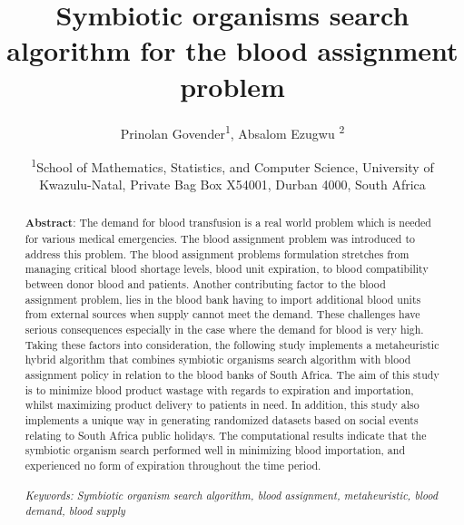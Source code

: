\documentclass{article}
\title{Symbiotic organisms search algorithm for the blood assignment problem}
\author{Prinolan Govender\textsuperscript{1}, Absalom Ezugwu \textsuperscript{2}}
\date{\textsuperscript{1}School of Mathematics, Statistics, and Computer Science, University of Kwazulu-Natal, Private Bag Box X54001, Durban 4000, South Africa}
\begin{document}
\maketitle
\begin{abstract}
  \textbf{Abstract}: The demand for blood transfusion is a real world problem which is needed for various medical emergencies. The blood assignment problem was introduced to address this problem. The blood assignment problems formulation stretches from managing critical blood shortage levels, blood unit expiration, to blood compatibility between donor blood and patients. Another contributing factor to the blood assignment problem, lies in the blood bank having to import additional blood units from external sources when supply cannot meet the demand. These challenges have serious consequences especially in the case where the demand for blood is very high. Taking these factors into consideration, the following study implements a metaheuristic hybrid algorithm that combines symbiotic organisms search algorithm with blood assignment policy in relation to the blood banks of South Africa. The aim of this study is to minimize blood product wastage with regards to expiration and importation, whilst maximizing product delivery to patients in need. In addition, this study also implements a unique way in generating randomized datasets based on social events relating to South Africa public holidays. The computational results indicate that the symbiotic organism search performed well in minimizing blood importation, and experienced no form of expiration throughout the time period.
  \\
  \\
\textit{Keywords: Symbiotic organism search algorithm, blood assignment, metaheuristic, blood demand, blood supply}

\end{abstract}
\end{document}
